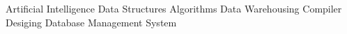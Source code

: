 
Artificial Intelligence \textbullet{} Data Structures \textbullet{} Algorithms \textbullet{} Data Warehousing \textbullet{} Compiler Desiging \textbullet{} Database Management System
